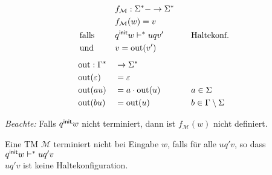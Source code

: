 \begin{Def} %
	\begin{alignat*}{3}
		&&&f_\mathcal{M}:\Sigma^*- \->\Sigma^*\\
		&&&f_\mathcal{M}(w)=v\\
		&\text{ falls } &&\qinit w \vdash^*uqv'&\quad&\text{Haltekonf.}\\
		&\text{ und } &&v=\out( v')\\[.5em]
		&\out:\Gamma^* &&\-> \Sigma^*\\
		&\out(\Eps) &&= \Eps\\
		&\out(au) &&= a\cdot\out(u) &\quad& a\in\Sigma\\
		&\out(bu) &&= \out(u) && b\in\Gamma\setminus\Sigma
	\end{alignat*}
\end{Def}
\emph{Beachte:} Falls $q^\mathsf{init} w$ nicht terminiert, dann ist $f_\mathcal{M}(w)$ nicht definiert.

Eine \ac{TM} $\mathcal{M}$ terminiert nicht bei Eingabe $w$, falls für alle $uq'v$, so dass $q^\mathsf{init} w\vdash^*uq'v$\\
$uq'v$ ist keine Haltekonfiguration.

